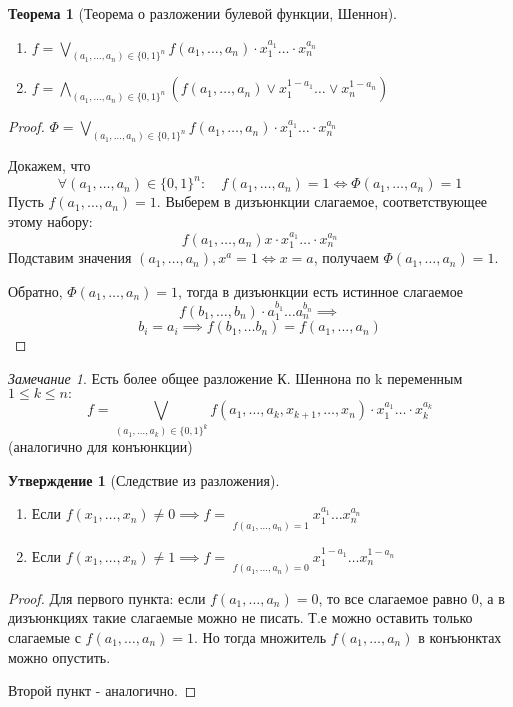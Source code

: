 \documentclass[a4paper]{article}
\newtheorem{theorem}{Теорема}[section]
\theoremstyle{definition}
\newtheorem*{statement}{Утверждение}
\theoremstyle{remark}
\newtheorem*{remark}{Замечание}
\begin{document}
    \begin{theorem}[Теорема о разложении булевой функции, Шеннон]
        \begin{enumerate}
            $f(x_1, \dots, x_n)$ - БФ. Тогда
            \item 
            $f = \bigvee\limits_{(a_1, \dots, a_n)\in \{0, 1\}^n} f(a_1, \dots, a_n) \cdot x_1^{a_1} \dots \cdot x_n^{a_n}$
            \item 
            $f = \bigwedge\limits_{(a_1, \dots, a_n)\in \{0, 1\}^n} (f(a_1, \dots, a_n) \vee x_1^{1-a_1} \dots \vee x_n^{1 -a_n})$
        \end{enumerate}
    \end{theorem}
    \begin{proof}
        $\Phi = \bigvee\limits_{(a_1, \dots, a_n)\in \{0, 1\}^n} f(a_1, \dots, a_n) \cdot x_1^{a_1} \dots \cdot x_n^{a_n}$

        Докажем, что $$\forall (a_1, \dots, a_n)\in \{0, 1\}^n: \quad f(a_1, \dots, a_n) = 1 \Leftrightarrow \Phi(a_1, \dots, a_n) = 1$$
        Пусть $f(a_1, \dots, a_n) = 1.$ Выберем в дизъюнкции слагаемое,
        соответствующее этому набору:
        $$f(a_1, \dots, a_n) x \cdot x_1^{a_1} \dots \cdot x_n^{a_n}$$
        Подставим значения $(a_1, \dots, a_n), x^a = 1 \Leftrightarrow x = a$,
        получаем $\Phi(a_1, \dots, a_n) = 1$.

        Обратно, $\Phi(a_1, \dots, a_n) = 1$, тогда в дизъюнкции есть истинное слагаемое
        $$f(b_1, \dots, b_n) \cdot a_1^{b_1}\dots a_n^{b_n}\implies$$
        $$b_i = a_i \implies f(b_1, \dots b_n) = f(a_1, ... , a_n)$$ 
    \end{proof}
    \begin{remark}
        Есть более общее разложение К. Шеннона по k переменным $1 \leq k \leq n:$
        $$f = \bigvee\limits_{(a_1, \dots, a_k)\in \{0, 1\}^k} f(a_1, \dots, a_k, x_{k+1}, \dots, x_n) \cdot x_1^{a_1} \dots \cdot x_k^{a_k}$$
        (аналогично для конъюнкции)
    \end{remark}
    \begin{statement}[Следствие из разложения]
        $ $\\
        \begin{enumerate}
            \item Если $f(x_1, \dots, x_n) \neq 0 \implies f = \mathop{\bigvee\limits_{(a_1, \dots, a_n)\in \{0, 1\}^n}}\limits_{f(a_1, \dots, a_n)=1}x_1^{a_1}\dots x_n^{a_n}$
            \item Если $f(x_1, \dots, x_n) \neq 1 \implies f = \mathop{\bigwedge\limits_{(a_1, \dots, a_n)\in \{0, 1\}^n}}\limits_{f(a_1, \dots, a_n)=0}x_1^{1 - a_1}\dots x_n^{1 - a_n}$
        \end{enumerate}
    \end{statement}
    \begin{proof}
        Для первого пункта: если $f(a_1, \dots, a_n) = 0$, то все слагаемое равно 0, а в дизъюнкциях
        такие слагаемые можно не писать. Т.е можно оставить только слагаемые с $f(a_1, \dots, a_n) = 1$.
        Но тогда множитель $f(a_1, \dots, a_n)$ в конъюнктах можно опустить.

        Второй пункт - аналогично.
    \end{proof}
\end{document}
